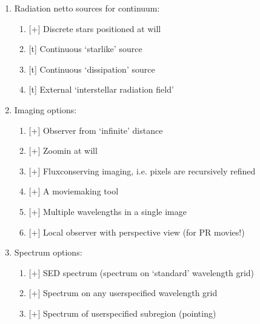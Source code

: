 \documentclass[letterpaper,10pt,english]{sphinxmanual}
\begin{document}
\begin{enumerate}
\item {} 
Radiation netto sources for continuum:
\begin{enumerate}
%
\item {} 
{[}+{]} Discrete stars positioned at will

\item {} 
{[}t{]} Continuous ‘starlike’ source

\item {} 
{[}t{]} Continuous ‘dissipation’ source

\item {} 
{[}t{]} External ‘interstellar radiation field’

\end{enumerate}

\item {} 
Imaging options:
\begin{enumerate}
%
\item {} 
{[}+{]} Observer from ‘infinite’ distance

\item {} 
{[}+{]} Zoom\sphinxhyphen{}in at will

\item {} 
{[}+{]} Flux\sphinxhyphen{}conserving imaging, i.e. pixels are recursively refined

\item {} 
{[}+{]} A movie\sphinxhyphen{}making tool

\item {} 
{[}+{]} Multiple wavelengths in a single image

\item {} 
{[}+{]} Local observer with perspective view (for PR movies!)

\end{enumerate}

\item {} 
Spectrum options:
\begin{enumerate}
%
\item {} 
{[}+{]} SED spectrum (spectrum on ‘standard’ wavelength grid)

\item {} 
{[}+{]} Spectrum on any user\sphinxhyphen{}specified wavelength grid

\item {} 
{[}+{]} Spectrum of user\sphinxhyphen{}specified sub\sphinxhyphen{}region (pointing)


\end{enumerate}
\end{enumerate}
\end{document}
